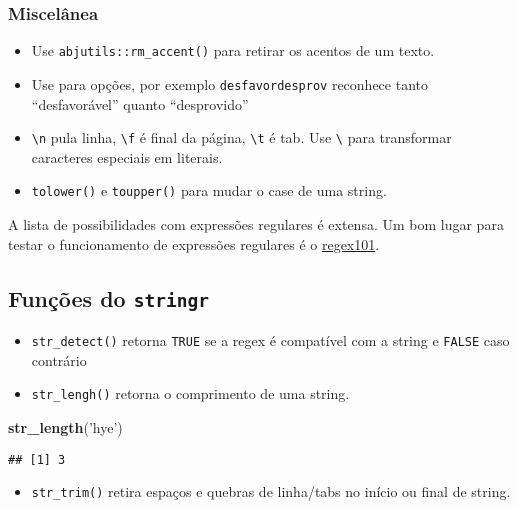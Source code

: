 \documentclass[]{book}
\newenvironment{Shaded}{\begin{snugshade}}{\end{snugshade}}
\newcommand{\KeywordTok}[1]{\textcolor[rgb]{0.13,0.29,0.53}{\textbf{{#1}}}}
\newcommand{\StringTok}[1]{\textcolor[rgb]{0.31,0.60,0.02}{{#1}}}
\newcommand{\NormalTok}[1]{{#1}}
\providecommand{\tightlist}{%
  \setlength{\itemsep}{0pt}\setlength{\parskip}{0pt}}
\begin{document}
\subsubsection{Miscelânea}\label{miscelanea}

\begin{itemize}
\tightlist
\item
  Use \texttt{abjutils::rm\_accent()} para retirar os acentos de um
  texto.
\item
  Use \texttt{\textbar{}} para opções, por exemplo
  \texttt{desfavor\textbar{}desprov} reconhece tanto ``desfavorável''
  quanto ``desprovido''
\item
  \texttt{\textbackslash{}n} pula linha, \texttt{\textbackslash{}f} é
  final da página, \texttt{\textbackslash{}t} é tab. Use
  \texttt{\textbackslash{}} para transformar caracteres especiais em
  literais.
\item
  \texttt{tolower()} e \texttt{toupper()} para mudar o case de uma
  string.
\end{itemize}

A lista de possibilidades com expressões regulares é extensa. Um bom
lugar para testar o funcionamento de expressões regulares é o
\href{https://regex101.com/}{regex101}.

\subsection{\texorpdfstring{Funções do
\texttt{stringr}}{Funções do stringr}}\label{funcoes-do-stringr}

\begin{itemize}
\item
  \texttt{str\_detect()} retorna \texttt{TRUE} se a regex é compatível
  com a string e \texttt{FALSE} caso contrário
\item
  \texttt{str\_lengh()} retorna o comprimento de uma string.
\end{itemize}

\begin{Shaded}
\begin{Highlighting}[]
\KeywordTok{str_length}\NormalTok{(}\StringTok{'hye'}\NormalTok{)}
\end{Highlighting}
\end{Shaded}

\begin{verbatim}
## [1] 3
\end{verbatim}

\begin{itemize}
\tightlist
\item
  \texttt{str\_trim()} retira espaços e quebras de linha/tabs no início
  ou final de string.
\end{itemize}
\end{document}

